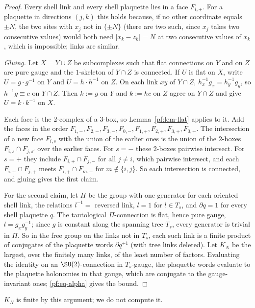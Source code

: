 \begin{proof}
Every shell link and every shell plaquette lies in a face $F_{i,\pm}$. For a plaquette in directions $(j,k)$ this holds because, if no other coordinate equals $\pm N$, the two sites with $x_j$ not in $\{\pm N\}$ (there are two such, since $x_j$ takes two consecutive values) would both need $|x_k-z_k|=N$ at two consecutive values of $x_k$, which is impossible; links are similar.

\emph{Gluing.} Let $X=Y\cup Z$ be subcomplexes such that flat connections on $Y$ and on $Z$ are pure gauge and the $1$-skeleton of $Y\cap Z$ is connected. If $U$ is flat on $X$, write $U=g\cdot g^{-1}$ on $Y$ and $U=h\cdot h^{-1}$ on $Z$. On each link $xy$ of $Y\cap Z$, $h_x^{-1}g_x=h_y^{-1}g_y$, so $h^{-1}g\equiv c$ on $Y\cap Z$. Then $k:=g$ on $Y$ and $k:=hc$ on $Z$ agree on $Y\cap Z$ and give $U=k\cdot k^{-1}$ on $X$.

Each face is the $2$-complex of a $3$-box, so Lemma~\ref{pf:lem-flat} applies to it. Add the faces in the order $F_{1,-},F_{2,-},F_{3,-},F_{0,-},F_{1,+},F_{2,+},F_{3,+},F_{0,+}$. The intersection of a new face $F_{i,s}$ with the union of the earlier ones is the union of the $2$-boxes $F_{i,s}\cap F_{j,s'}$ over the earlier faces. For $s=-$ these $2$-boxes pairwise intersect. For $s=+$ they include $F_{i,+}\cap F_{j,-}$ for all $j\ne i$, which pairwise intersect, and each $F_{i,+}\cap F_{j,+}$ meets $F_{i,+}\cap F_{m,-}$ for $m\notin\{i,j\}$. So each intersection is connected, and gluing gives the first claim.

For the second claim, let $\Pi$ be the group with one generator for each oriented shell link, the relations $l^{-1}=$ reversed link, $l=1$ for $l\in T_s$, and $\partial q=1$ for every shell plaquette $q$. The tautological $\Pi$-connection is flat, hence pure gauge, $l=g_xg_y^{-1}$; since $g$ is constant along the spanning tree $T_s$, every generator is trivial in $\Pi$. So in the free group on the links not in $T_s$, each such link is a finite product of conjugates of the plaquette words $\partial q^{\pm1}$ (with tree links deleted). Let $K_N$ be the largest, over the finitely many links, of the least number of factors. Evaluating the identity on an $\SU(2)$-connection in $T_s$-gauge, the plaquette words evaluate to the plaquette holonomies in that gauge, which are conjugate to the gauge-invariant ones; \eqref{pf:eq-alpha} gives the bound.
\end{proof}

$K_N$ is finite by this argument; we do not compute it.

